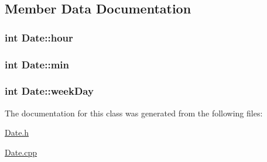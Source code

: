 \subsection{Member Data Documentation}
\subsubsection[{\texorpdfstring{hour}{hour}}]{\setlength{\rightskip}{0pt plus 5cm}int Date\+::hour}\hypertarget{classDate_a59f93395dbec8ce9945f2ea091250c42}{}\label{classDate_a59f93395dbec8ce9945f2ea091250c42}
\subsubsection[{\texorpdfstring{min}{min}}]{\setlength{\rightskip}{0pt plus 5cm}int Date\+::min}\hypertarget{classDate_a3e2870587849f6dc96e83b1b767e3854}{}\label{classDate_a3e2870587849f6dc96e83b1b767e3854}
\subsubsection[{\texorpdfstring{week\+Day}{weekDay}}]{\setlength{\rightskip}{0pt plus 5cm}int Date\+::week\+Day}\hypertarget{classDate_abc9d37a992598e0176df74f520cb202c}{}\label{classDate_abc9d37a992598e0176df74f520cb202c}


The documentation for this class was generated from the following files\+:\begin{DoxyCompactItemize}
\item 
\hyperlink{Date_8h}{Date.\+h}\item 
\hyperlink{Date_8cpp}{Date.\+cpp}\end{DoxyCompactItemize}
